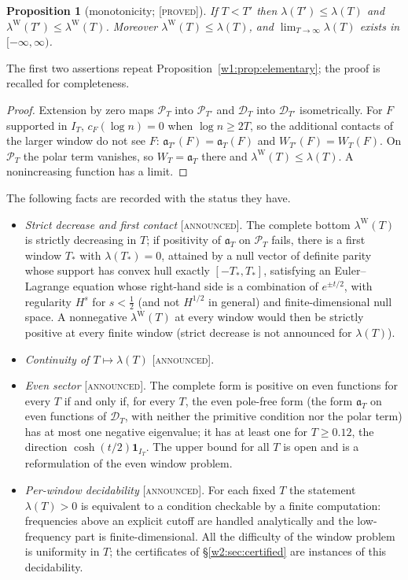 \documentclass[11pt]{amsart}
\newtheorem{proposition}[theorem]{Proposition}
\theoremstyle{definition}
\theoremstyle{remark}
\numberwithin{equation}{section}
\newcommand{\IT}{I_T}                                  %
\newcommand{\cF}{c_F}                                  %
\newcommand{\PT}{\mathcal{P}_T}                        %
\newcommand{\DT}{\mathcal{D}_T}                        %
\newcommand{\aT}{\mathfrak{a}_T}                       %
\newcommand{\WT}{W_T}                                  %
\newcommand{\lam}{\lambda(T)}                          %
\newcommand{\lamW}{\lambda^{\mathrm W}(T)}             %
\newcommand{\Tst}{T_{*}}                               %
\newcommand{\stag}[1]{\textsc{[#1]}}
\newcommand{\PROVED}{\stag{proved}}
\newcommand{\ANNOUNCED}{\stag{announced}}
\begin{document}
\begin{proposition}[monotonicity; \PROVED]\label{w2:prop:monotone}
If $T<T'$ then $\lambda(T')\le\lambda(T)$ and $\lambda^{\mathrm W}(T')\le\lambda^{\mathrm W}(T)$. Moreover
$\lamW\le\lam$, and $\lim_{T\to\infty}\lam$ exists in $[-\infty,\infty)$.
\end{proposition}
The first two assertions repeat Proposition~\ref{w1:prop:elementary}; the proof is recalled for completeness.


\begin{proof}
Extension by zero maps $\PT$ into $\mathcal P_{T'}$ and $\DT$ into $\mathcal D_{T'}$ isometrically. For $F$ supported in
$\IT$, $\cF(\log n)=0$ when $\log n\ge2T$, so the additional contacts of the larger window do not see $F$:
$\mathfrak a_{T'}(F)=\aT(F)$ and $W_{T'}(F)=\WT(F)$. On $\PT$ the polar term vanishes, so $\WT=\aT$ there and
$\lamW\le\lam$. A nonincreasing function has a limit.
\end{proof}

The following facts are recorded with the status they have.
\begin{itemize}
\item \emph{Strict decrease and first contact} \ANNOUNCED. The complete bottom $\lamW$ is strictly decreasing in $T$; if positivity of $\aT$ on $\PT$
fails, there is a first window $\Tst$ with $\lambda(\Tst)=0$, attained by a null vector of definite parity whose support
has convex hull exactly $[-\Tst,\Tst]$, satisfying an Euler--Lagrange equation whose right-hand side is a combination of
$e^{\pm t/2}$, with regularity $H^s$ for $s<\frac12$ (and not $H^{1/2}$ in general) and finite-dimensional null space.
A nonnegative $\lamW$ at every window would then be strictly positive at every finite window (strict decrease is not announced for $\lam$).
\item \emph{Continuity of $T\mapsto\lam$} \ANNOUNCED.
\item \emph{Even sector} \ANNOUNCED. The complete form is positive on even functions for every $T$ if and only if, for
every $T$, the even pole-free form (the form $\aT$ on even functions of $\DT$, with neither the primitive condition nor
the polar term) has at most one negative eigenvalue; it has at least one for $T\ge0.12$, the direction
$\cosh(t/2)\mathbf 1_{\IT}$. The upper bound for all $T$ is open and is a reformulation of the even window problem.
\item \emph{Per-window decidability} \ANNOUNCED. For each fixed $T$ the statement $\lam>0$ is equivalent to a condition
checkable by a finite computation: frequencies above an explicit cutoff are handled analytically and the low-frequency
part is finite-dimensional. All the difficulty of the window problem is uniformity in $T$; the certificates of
\S\ref{w2:sec:certified} are instances of this decidability.
\end{itemize}
\end{document}
